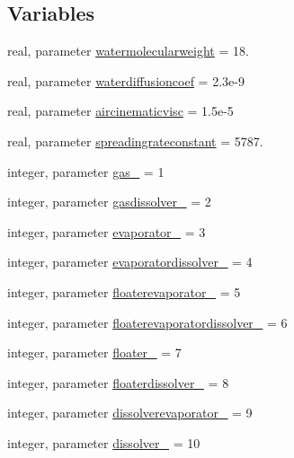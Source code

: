 \subsection*{Variables}
\begin{DoxyCompactItemize}
\item 
real, parameter \mbox{\hyperlink{namespacemodulehns_aad6ce5a9588d71fd220382594f3ebead}{watermolecularweight}} = 18.
\item 
real, parameter \mbox{\hyperlink{namespacemodulehns_aefafa2b5510ebc07de11b9d21aa664ba}{waterdiffusioncoef}} = 2.\+3e-\/9
\item 
real, parameter \mbox{\hyperlink{namespacemodulehns_aaa60d48f4a69de776e4d6d3c202a822a}{aircinematicvisc}} = 1.\+5e-\/5
\item 
real, parameter \mbox{\hyperlink{namespacemodulehns_ad84ee382328093946ea2771a16dbaa41}{spreadingrateconstant}} = 5787.
\item 
integer, parameter \mbox{\hyperlink{namespacemodulehns_aef3a83c33839f6914b9e84080e96d98b}{gas\+\_\+}} = 1
\item 
integer, parameter \mbox{\hyperlink{namespacemodulehns_a5988a9ef40c61141e18e7a4142e26c66}{gasdissolver\+\_\+}} = 2
\item 
integer, parameter \mbox{\hyperlink{namespacemodulehns_a1c4da7f59d93e9880ab1dfe83261e4d9}{evaporator\+\_\+}} = 3
\item 
integer, parameter \mbox{\hyperlink{namespacemodulehns_a444efbb573a36e11ac20ebc867ec732f}{evaporatordissolver\+\_\+}} = 4
\item 
integer, parameter \mbox{\hyperlink{namespacemodulehns_a5f5d37f56b892349502cbcb42287a505}{floaterevaporator\+\_\+}} = 5
\item 
integer, parameter \mbox{\hyperlink{namespacemodulehns_adf7de4913f5ef154bbdc3c38a14d837f}{floaterevaporatordissolver\+\_\+}} = 6
\item 
integer, parameter \mbox{\hyperlink{namespacemodulehns_acca937d62ed3b694dc28629fdee08561}{floater\+\_\+}} = 7
\item 
integer, parameter \mbox{\hyperlink{namespacemodulehns_a065860e13c610ed17fc54cbb69420b06}{floaterdissolver\+\_\+}} = 8
\item 
integer, parameter \mbox{\hyperlink{namespacemodulehns_afee2c4aee2b6391f2f16da4601cb64ac}{dissolverevaporator\+\_\+}} = 9
\item 
integer, parameter \mbox{\hyperlink{namespacemodulehns_ac3d664a8e67e552a9295f78c85e458a4}{dissolver\+\_\+}} = 10
\item 

\end{DoxyCompactItemize}
